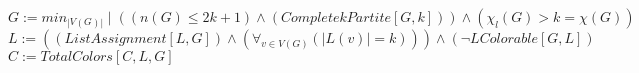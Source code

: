 \documentclass{book}
\newcommand{\abr}{:=}
\newcommand{\st}{\mathbin{|}}
\begin{document}
$G \abr min_{|V(G)|} \st ((n(G) \leq 2 k + 1) \land (CompletekPartite[G, k])) \land (\chi_l(G) > k = \chi(G))$ \\
$L \abr ((ListAssignment[L, G]) \land (\forall_{v \in V(G)}(|L(v)| = k))) \land (\lnot LColorable[G, L])$ \\
$C \abr TotalColors[C, L, G]$ \\






\newpage
\end{document}
